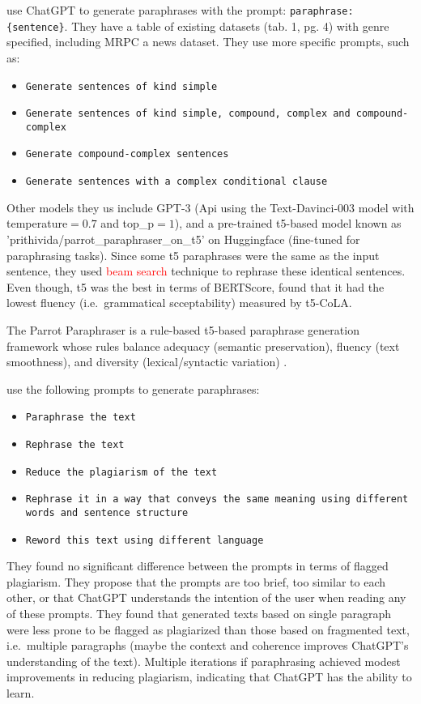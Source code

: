 \citet{kurt_pehlivanoglu_comparative_2024} use ChatGPT to generate paraphrases with the prompt:
\texttt{paraphrase:\{sentence\}}.
They have a table of existing datasets (tab. 1, pg. 4) with genre specified, including MRPC a news dataset.
They use more specific prompts, such as:
\begin{itemize}
    \item \texttt{Generate sentences of kind simple}
    \item \texttt{Generate sentences of kind simple, compound, complex and compound-complex}
    \item \texttt{Generate compound-complex sentences}
    \item \texttt{Generate sentences with a complex conditional clause}
\end{itemize}
Other models they us include GPT-3 (Api using the Text-Davinci-003 model with temperature$=0.7$ and top\_p$=1$), 
and a pre-trained \ac{t5}-based model known as 'prithivida/parrot\_paraphraser\_on\_\ac{t5}' on Huggingface (fine-tuned for paraphrasing tasks).
Since some \ac{t5} paraphrases were the same as the input sentence, they used \textcolor{red}{beam search} technique to rephrase these identical sentences.
Even though, \ac{t5} was the best in terms of BERTScore, 
\citet{kurt_pehlivanoglu_comparative_2024} found that it had the lowest fluency (i.e.\ grammatical scceptability) measured by \ac{t5}-CoLA.

The Parrot Paraphraser is a rule-based \ac{t5}-based paraphrase generation framework whose 
rules balance adequacy (semantic preservation), fluency (text smoothness), and diversity (lexical/syntactic variation) \citep{zhou_paraphrase_2025}.

\citet{hassanipour_ability_2024} use the following prompts to generate paraphrases:
\begin{itemize}
    \item \texttt{Paraphrase the text}
    \item \texttt{Rephrase the text}
    \item \texttt{Reduce the plagiarism of the text}
    \item \texttt{Rephrase it in a way that conveys the same meaning using different words and sentence structure}
    \item \texttt{Reword this text using different language}
\end{itemize}
They found no significant difference between the prompts in terms of flagged plagiarism.
They propose that the prompts are too brief, too similar to each other, or that ChatGPT understands the intention of the user when reading any of these prompts.
They found that generated texts based on single paragraph were less prone to be flagged as plagiarized than those based on fragmented text, i.e.\ multiple paragraphs
(maybe the context and coherence improves ChatGPT's understanding of the text).
Multiple iterations if paraphrasing achieved modest improvements in reducing plagiarism, indicating that ChatGPT has the ability to learn.

